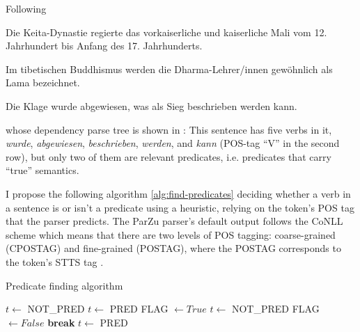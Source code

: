 Following \cite{foth2006umfassende}

\begin{examples}
	\label{ex:one-predicate}
	\item Die Keita-Dynastie regierte das vorkaiserliche und kaiserliche Mali vom 12. Jahrhundert bis Anfang des 17. Jahrhunderts.
\end{examples}

\begin{examples}
	\label{ex:one-predicate-mod}
	\item Im tibetischen Buddhismus werden die Dharma-Lehrer/innen gewöhnlich als Lama bezeichnet.
\end{examples}

\begin{examples}
	\label{ex:multiple-predicates}
	\item Die Klage wurde abgewiesen, was als Sieg beschrieben werden kann.
\end{examples}

whose dependency parse tree is shown in :
This sentence has five verbs in it, \textit{wurde}, \textit{abgewiesen}, \textit{beschrieben}, \textit{werden}, and \textit{kann} (POS-tag ``V'' in the second row), but only two of them are relevant predicates, i.e. predicates that carry ``true'' semantics.


I propose the following algorithm \ref{alg:find-predicates} deciding whether a verb in a sentence is or isn't a predicate using a heuristic, relying on the token's POS tag that the parser predicts.
The ParZu parser's default output follows the CoNLL scheme \citep{buchholz2006conll} which means that there are two levels of POS tagging: coarse-grained (CPOSTAG) and fine-grained (POSTAG), where the POSTAG corresponds to the token's STTS tag \citep{schiller1999guidelines}.

\begin{algorithm}
\caption{Predicate finding algorithm}
\label{alg:find-predicates}
	\begin{algorithmic}[1]
			\STATE $t \leftarrow$ NOT\_PRED
		\ELSE
				\STATE $t \leftarrow$ PRED
			\ELSE
				\STATE FLAG $\leftarrow True$
						\STATE $t \leftarrow$ NOT\_PRED
						\STATE FLAG $\leftarrow False$
						\STATE \textbf{break}
					\ENDIF
				\ENDFOR
				\IF{FLAG $= True$}
					\STATE $t \leftarrow$ PRED
				\ENDIF
			\ENDIF
		\ENDIF
	\ENDFOR
\end{algorithmic}
\end{algorithm}


